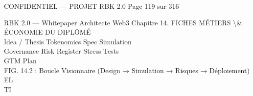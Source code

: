 \vspace{0.5em}
\vspace{0.5em}
\vspace{0.5em}
\begin{confidential}CONFIDENTIEL — PROJET RBK 2.0                                            Page 119 sur 316\end{confidential}
RBK 2.0 — Whitepaper Architecte Web3                                                  Chapitre 14. FICHES MÉTIERS \textbackslash{}& ÉCONOMIE DU DIPLÔMÉ\\
\vspace{0.5em}
\vspace{0.5em}
\vspace{0.5em}
Idea / Thesis           Tokenomics Spec               Simulation\\
\vspace{0.5em}
\vspace{0.5em}
\vspace{0.5em}
\vspace{0.5em}
Governance             Risk Register          Stress Tests\\
\vspace{0.5em}
\vspace{0.5em}
\vspace{0.5em}
\vspace{0.5em}
GTM Plan\\
\vspace{0.5em}
FIG. 14.2 : Boucle Visionnaire (Design → Simulation → Risques → Déploiement)\\
\vspace{0.5em}
\vspace{0.5em}
\vspace{0.5em}
\vspace{0.5em}
EL\\
TI\\
